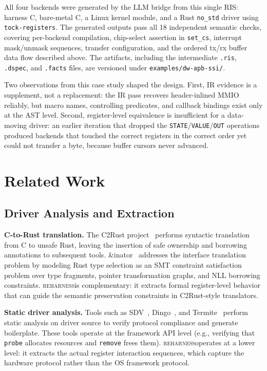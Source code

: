 \documentclass[sigplan, screen, review, anonymous]{acmart}
\newcommand{\reharness}{\textsc{reharness}}
\begin{document}
All four backends were generated by the LLM bridge from this single RIS: harness C, bare-metal C, a Linux kernel module, and a Rust \texttt{no\_std} driver using \texttt{tock-registers}. The generated outputs pass all 18 independent semantic checks, covering per-backend compilation, chip-select assertion in \texttt{set\_cs}, interrupt mask/unmask sequences, transfer configuration, and the ordered tx/rx buffer data flow described above. The artifacts, including the intermediate \texttt{.ris}, \texttt{.dspec}, and \texttt{.facts} files, are versioned under \texttt{examples/dw-apb-ssi/}.

Two observations from this case study shaped the design. First, IR evidence is a supplement, not a replacement: the IR pass recovers header-inlined MMIO reliably, but macro names, controlling predicates, and callback bindings exist only at the AST level. Second, register-level equivalence is insufficient for a data-moving driver: an earlier iteration that dropped the \texttt{STATE}/\texttt{VALUE}/\texttt{OUT} operations produced backends that touched the correct registers in the correct order yet could not transfer a byte, because buffer cursors never advanced.

\section{Related Work}

\subsection{Driver Analysis and Extraction}

\textbf{C-to-Rust translation.} The C2Rust project~\cite{emrath2021c2rust} performs syntactic translation from C to unsafe Rust, leaving the insertion of safe ownership and borrowing annotations to subsequent tools. \&inator~\cite{andinator2026} addresses the interface translation problem by modeling Rust type selection as an SMT constraint satisfaction problem over type fragments, pointer transformation graphs, and NLL borrowing constraints. \reharness is complementary: it extracts formal register-level behavior that can guide the semantic preservation constraints in C2Rust-style translators.

\textbf{Static driver analysis.} Tools such as SDV~\cite{ball2006thorough}, Dingo~\cite{ryzhyk2009dingo}, and Termite~\cite{ryzhyk2009termite} perform static analysis on driver source to verify protocol compliance and generate boilerplate. These tools operate at the framework API level (e.g., verifying that \texttt{probe} allocates resources and \texttt{remove} frees them). \reharness operates at a lower level: it extracts the actual register interaction sequences, which capture the hardware protocol rather than the OS framework protocol.
\end{document}
